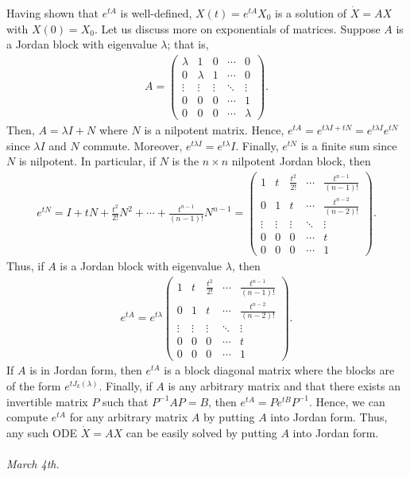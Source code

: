 Having shown that $e^{tA}$ is well-defined, $X(t) = e^{tA} X_{0}$ is a solution of $\dot{X} = AX$ with $X(0) = X_{0}$. Let us discuss more on exponentials of matrices. Suppose $A$ is a Jordan block with eigenvalue $\lambda$; that is, \begin{align}
    A = \begin{pmatrix}
        \lambda & 1 & 0 & \cdots & 0 \\
        0 & \lambda & 1 & \cdots & 0 \\
        \vdots & \vdots & \vdots & \ddots & \vdots \\
        0 & 0 & 0 & \cdots & 1 \\
        0 & 0 & 0 & \cdots & \lambda
    \end{pmatrix}.
\end{align}
Then, $A = \lambda I + N$ where $N$ is a nilpotent matrix. Hence, $e^{tA} = e^{t\lambda I + tN} = e^{t\lambda I} e^{tN}$ since $\lambda I$ and $N$ commute. Moreover, $e^{t\lambda I} = e^{t\lambda} I$. Finally, $e^{tN}$ is a finite sum since $N$ is nilpotent. In particular, if $N$ is the $n \times n$ nilpotent Jordan block, then
\begin{align}
    e^{tN} = I + tN + \frac{t^{2}}{2!} N^{2} + \cdots + \frac{t^{n-1}}{(n-1)!} N^{n-1} = \begin{pmatrix}
        1 & t & \frac{t^{2}}{2!} & \cdots & \frac{t^{n-1}}{(n-1)!} \\
        0 & 1 & t & \cdots & \frac{t^{n-2}}{(n-2)!} \\
        \vdots & \vdots & \vdots & \ddots & \vdots \\
        0 & 0 & 0 & \cdots & t \\
        0 & 0 & 0 & \cdots & 1
    \end{pmatrix}.
\end{align}
Thus, if $A$ is a Jordan block with eigenvalue $\lambda$, then
\begin{align}
    e^{tA} = e^{t\lambda} \begin{pmatrix}
        1 & t & \frac{t^{2}}{2!} & \cdots & \frac{t^{n-1}}{(n-1)!} \\
        0 & 1 & t & \cdots & \frac{t^{n-2}}{(n-2)!} \\
        \vdots & \vdots & \vdots & \ddots & \vdots \\
        0 & 0 & 0 & \cdots & t \\
        0 & 0 & 0 & \cdots & 1
    \end{pmatrix}.
\end{align}
If $A$ is in Jordan form, then $e^{tA}$ is a block diagonal matrix where the blocks are of the form $e^{tJ_{k}(\lambda)}$. Finally, if $A$ is any arbitrary matrix and that there exists an invertible matrix $P$ such that $P^{-1}AP = B$, then $e^{tA} = P e^{tB} P^{-1}$. Hence, we can compute $e^{tA}$ for any arbitrary matrix $A$ by putting $A$ into Jordan form. Thus, any such ODE $\dot{X} = AX$ can be easily solved by putting $A$ into Jordan form.
\\ \\
\textit{March 4th.}

